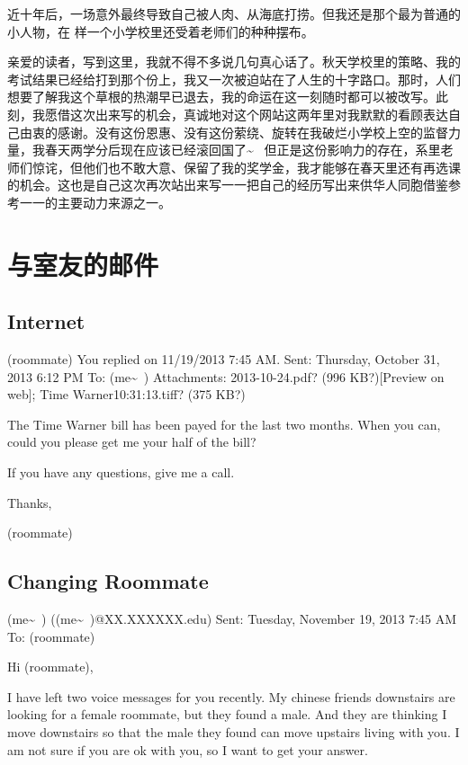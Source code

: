 \documentclass[12pt]{book}
\begin{document}
近十年后，一场意外最终导致自己被人肉、从海底打捞。但我还是那个最为普通的小人物，在 样一个小学校里还受着老师们的种种摆布。

亲爱的读者，写到这里，我就不得不多说几句真心话了。秋天学校里的策略、我的考试结果已经给打到那个份上，我又一次被迫站在了人生的十字路口。那时，人们想要了解我这个草根的热潮早已退去，我的命运在这一刻随时都可以被改写。此刻，我愿借这次出来写的机会，真诚地对这个网站这两年里对我默默的看顾表达自己由衷的感谢。没有这份恩惠、没有这份萦绕、旋转在我破烂小学校上空的监督力量，我春天两学分后现在应该已经滚回国了\textasciitilde{}~  但正是这份影响力的存在，系里老师们惊诧，但他们也不敢大意、保留了我的奖学金，我才能够在春天里还有再选课的机会。这也是自己这次再次站出来写一一把自己的经历写出来供华人同胞借鉴参考一一的主要动力来源之一。

\chapter{与室友的邮件}
\label{sec-16}

\section{Internet}
\label{sec-16-1}
(roommate)
You replied on 11/19/2013 7:45 AM.
Sent:        Thursday, October 31, 2013 6:12 PM
To:        
(me\textasciitilde{}~)
Attachments:        
2013-10-24.pdf? (996 KB?)[Preview on web]; Time Warner10:31:13.tiff? (375 KB?)

The Time Warner bill has been payed for the last two months. When you can, could you please get me your half of the bill?

If you have any questions, give me a call.

Thanks,

(roommate)
　

\section{Changing Roommate}
\label{sec-16-2}
(me\textasciitilde{}~) ((me\textasciitilde{}~)@XX.XXXXXX.edu)
Sent:        Tuesday, November 19, 2013 7:45 AM
To:        
(roommate)

Hi (roommate), 

I have left two voice messages for you recently. My chinese friends downstairs are looking for a female roommate, but they found a male. And they are thinking I move downstairs so that the male they found can move upstairs living with you. I am not sure if you are ok with you, so I want to get your answer. 
\end{document}
